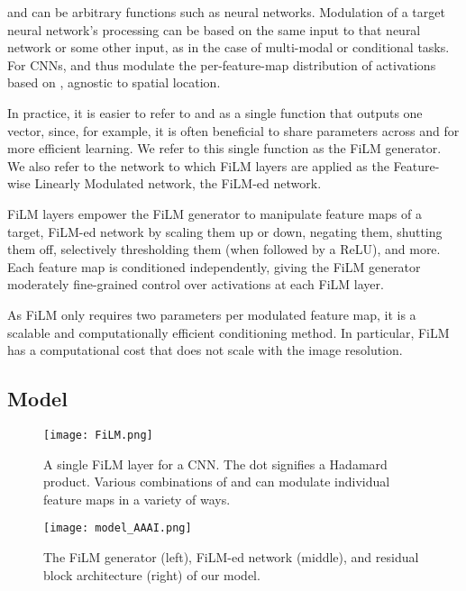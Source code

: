 \documentclass[letterpaper]{article} \usepackage{aaai18}  \usepackage{times}  \usepackage{helvet}  \usepackage{courier}  \usepackage{url}  \usepackage{graphicx}  \frenchspacing  \setlength{\pdfpagewidth}{8.5in}  \setlength{\pdfpageheight}{11in}
\begin{document}
 and  can be arbitrary functions such as neural networks. Modulation of a target neural network's processing can be based on the same input to that neural network or some other input, as in the case of multi-modal or conditional tasks. For CNNs,  and  thus modulate the per-feature-map distribution of activations based on , agnostic to spatial location.

	In practice, it is easier to refer to  and  as a single function that outputs one  vector, since, for example, it is often beneficial to share parameters across  and  for more efficient learning. We refer to this single function as the FiLM generator. We also refer to the network to which FiLM layers are applied as the Feature-wise Linearly Modulated network, the FiLM-ed network.

	FiLM layers empower the FiLM generator to manipulate feature maps of a target, FiLM-ed network by scaling them up or down, negating them, shutting them off, selectively thresholding them (when followed by a ReLU), and more. Each feature map is conditioned independently, giving the FiLM generator moderately fine-grained control over activations at each FiLM layer.
    
    As FiLM only requires two parameters per modulated feature map, it is a scalable and computationally efficient conditioning method. In particular, FiLM has a computational cost that does not scale with the image resolution.

	\subsection{Model}
		\label{model}

        \begin{figure}[t]
            \centering
            \texttt{[image: FiLM.png]}
	            \caption{A single FiLM layer for a CNN. The dot signifies a Hadamard product. Various combinations of  and  can modulate individual feature maps in a variety of ways.}
            \label{fig:FiLM}
        \end{figure}

        \begin{figure}[t]
            \centering
            \texttt{[image: model\_AAAI.png]}
	            \caption{The FiLM generator (left), FiLM-ed network (middle), and residual block architecture (right) of our model.}
            \label{fig:model}
        \end{figure}
\end{document}
